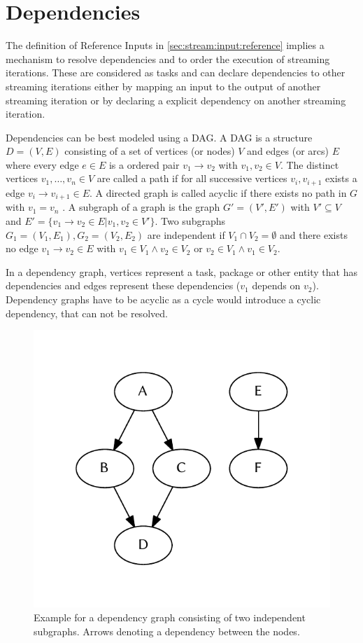   \section{Dependencies}
    \label{sec:stream:dependencies}
    The definition of Reference Inputs in \cref{sec:stream:input:reference} implies a mechanism to resolve dependencies and to order the execution of streaming iterations. These are considered as tasks and can declare dependencies to other streaming iterations either by mapping an input to the output of another streaming iteration or by declaring a explicit dependency on another streaming iteration.

    Dependencies can be best modeled using a \ac{DAG}. A \ac{DAG} is a structure $D=(V, E)$ consisting of a set of vertices (or nodes) $V$ and edges (or arcs) $E$ where every edge $e\in E$ is a ordered pair $v_1 \rightarrow v_2$ with $v_1, v_2 \in V$. The distinct vertices $v_1,\dots,v_n\in V$ are called a path if for all successive vertices $v_i, v_{i+1}$ exists a edge $v_i \rightarrow v_{i+1} \in E$. A directed graph is called acyclic if there exists no path in $G$ with $v_1 = v_n$ \citep{jungnickel2012graphs}. A subgraph of a graph is the graph $G' = (V', E')$ with $V'\subseteq V$ and $E' = \{v_1 \rightarrow v_2 \in E | v_1, v_2\in V'\}$. Two subgraphs $G_1 = (V_1, E_1), G_2 = (V_2, E_2)$ are independent if $V_1 \cap V_2 = \emptyset$ and there exists no edge $v_1\rightarrow v_2\in E$ with $v_1\in V_1 \wedge v_2\in V_2$ or $v_2\in V_1 \wedge v_1\in V_2$.

    In a dependency graph, vertices represent a task, package or other entity that has dependencies and edges represent these dependencies ($v_1$ depends on $v_2$). Dependency graphs have to be acyclic as a cycle would introduce a cyclic dependency, that can not be resolved.

    \begin{figure}[!htb]
      \centering
      \includegraphics[width=0.44694533762057875\linewidth]{figures/unordered-graph.pdf} %
      \caption{\label{fig:graph:unordered}Example for a dependency graph consisting of two independent subgraphs. Arrows denoting a dependency between the nodes.}
    \end{figure}

